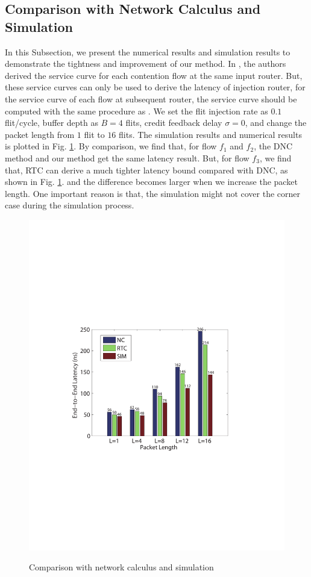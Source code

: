 \documentclass[10pt,journal]{IEEEtran}
\begin{document}
\subsection{Comparison with Network Calculus and Simulation}
In this Subsection, we present the numerical results and simulation results to demonstrate the tightness and improvement of our method. In \cite{Qian489900}, the authors derived the service curve for each contention flow at the same input router. But, these service curves can only be used to derive the latency of injection router, for the service curve of each flow at subsequent router, the service curve should be computed with the same procedure as \cite{qian2009analysis}. We set the flit injection rate as $0.1$ flit/cycle, buffer depth as $B=4$ flits, credit feedback delay $\sigma=0$, and change the packet length from $1$ flit to $16$ flits. The simulation results and numerical results is plotted in Fig. \ref{comparison}. By comparison, we find that, for flow $f_1$ and $f_2$, the DNC method and our method get the same latency result. But, for flow $f_3$, we find that, RTC can derive a much tighter latency bound compared with DNC, as shown in Fig. \ref{comparison}. and the difference becomes larger when we increase the packet length. One important reason is that, the simulation might not cover the corner case during the simulation process.
\begin{figure}
  \centering
  \includegraphics[scale=0.6]{figures/comparison.pdf}\\
  \caption{Comparison with network calculus and simulation}\label{comparison}
\end{figure}
\end{document}
